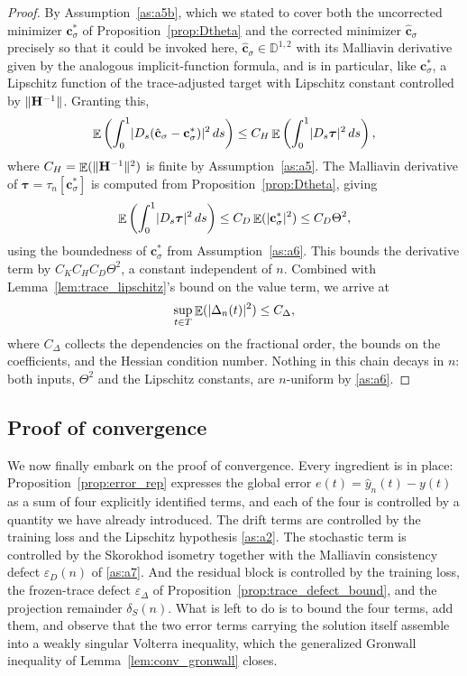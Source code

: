 \documentclass[11pt, a4paper]{article}
\theoremstyle{theoremstyle}
\theoremstyle{definitionstyle}
\newcommand{\dd}{\mathop{}\!d}
\DeclareMathOperator{\EE}{\mathbb E}
\DeclarePairedDelimiter{\norm}{\lVert}{\rVert}
\DeclarePairedDelimiter{\abs}{\lvert}{\rvert}
\begin{document}
\begin{proof}
By Assumption~\ref{as:a5b}, which we stated to cover both the uncorrected minimizer $\mathbf c^*_\sigma$ of Proposition~\ref{prop:Dtheta} and the corrected minimizer $\hat{\mathbf c}_\sigma$ precisely so that it could be invoked here, $\hat{\mathbf c}_\sigma\in\mathbb D^{1,2}$ with its Malliavin derivative given by the analogous implicit-function formula, and is in particular, like $\mathbf c^*_\sigma$, a Lipschitz function of the trace-adjusted target with Lipschitz constant controlled by $\norm{\mathbf H^{-1}}$. Granting this,
    \begin{equation}
        \EE\left(\int_0^1 \abs{D_s(\hat{\mathbf c}_\sigma - \mathbf c^*_\sigma)}^2 \dd{s}\right) \leq C_H \EE\left(\int_0^1 \abs{D_s \boldsymbol \tau}^2 \dd{s}\right),
    \end{equation}
    where $C_H = \EE(\norm{\mathbf H^{-1}}^2)$ is finite by Assumption~\ref{as:a5}. The Malliavin derivative of $\boldsymbol \tau = \tau_n[\mathbf c^*_\sigma]$ is computed from Proposition~\ref{prop:Dtheta}, giving
    \begin{equation}
        \EE\left(\int_0^1 \abs{D_s \boldsymbol \tau}^2 \dd{s}\right) \leq C_D \EE(\abs{\mathbf c^*_\sigma}^2) \leq C_D \Theta^2,
    \end{equation}
    using the boundedness of $\mathbf c^*_\sigma$ from Assumption~\ref{as:a6}. This bounds the derivative term by $C_KC_HC_D\Theta^2$, a constant independent of $n$. Combined with Lemma~\ref{lem:trace_lipschitz}'s bound on the value term, we arrive at
    \begin{equation}
        \sup_{t \in T}\EE(\abs{\Delta_n(t)}^2) \leq C_\Delta,
    \end{equation}
    where $C_\Delta$ collects the dependencies on the fractional order, the bounds on the coefficients, and the Hessian condition number. Nothing in this chain decays in $n$: both inputs, $\Theta^2$ and the Lipschitz constants, are $n$-uniform by \ref{as:a6}.
\end{proof}
\subsection{Proof of convergence}
We now finally embark on the proof of convergence. Every ingredient is in place: Proposition~\ref{prop:error_rep} expresses the global error $e(t) = \hat y_n(t) - y(t)$ as a sum of four explicitly identified terms, and each of the four is controlled by a quantity we have already introduced. The drift terms are controlled by the training loss and the Lipschitz hypothesis \ref{as:a2}. The stochastic term is controlled by the Skorokhod isometry together with the Malliavin consistency defect $\varepsilon_D(n)$ of \ref{as:a7}. And the residual block is controlled by the training loss, the frozen-trace defect $\varepsilon_\Delta$ of Proposition~\ref{prop:trace_defect_bound}, and the projection remainder $\delta_S(n)$. What is left to do is to bound the four terms, add them, and observe that the two error terms carrying the solution itself assemble into a weakly singular Volterra inequality, which the generalized Gronwall inequality of Lemma~\ref{lem:conv_gronwall} closes.
\end{document}
